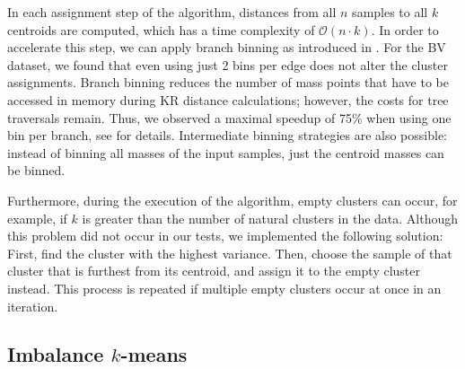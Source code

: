 In each assignment step of the algorithm, distances from all $n$ samples to all $k$ centroids are computed,
which has a time complexity of $\mathcal{O}(n \cdot k)$.
In order to accelerate this step, we can apply branch binning
as introduced in .
For the \ac{BV} dataset, we found that even using just \num{2} bins per edge does not alter the cluster assignments.
Branch binning reduces the number of mass points that have to be accessed in memory during KR distance calculations;
however, the costs for tree traversals remain.
Thus, we observed a maximal speedup of 75\% when using one bin per branch,
see  for details.
Intermediate binning strategies are also possible:
instead of binning all masses of the input samples, just the centroid masses can be binned.


Furthermore, during the execution of the algorithm, empty clusters can occur,
for example, if $k$ is greater than the number of natural clusters in the data.
Although this problem did not occur in our tests, we implemented the following solution:
First, find the cluster with the highest variance.
Then, choose the sample of that cluster that is furthest from its centroid,
and assign it to the empty cluster instead.
This process is repeated if multiple empty clusters occur at once in an iteration.


\subsection{Imbalance \texorpdfstring{$k$-means}{k-means}}
\label{ch:Clustering:sec:Methods:sub:ImbalanceKmeans}


